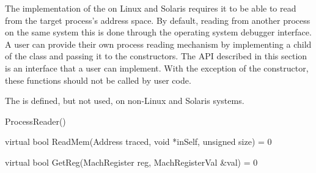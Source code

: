 The implementation of the  on Linux and Solaris requires it to be able to read from the target process's address space. By default, reading from another process on the same system this is done through the operating system debugger interface. A user can provide their own process reading mechanism by implementing a child of the  class and passing it to the  constructors. 
The API described in this section is an interface that a user can implement. With the exception of the  constructor, these functions should not be called by user code.

The  is defined, but not used, on non-Linux and Solaris systems.

\begin{apient}
ProcessReader()
\end{apient}

\begin{apient}
virtual bool ReadMem(Address traced,
                     void *inSelf,
                     unsigned size) = 0
\end{apient}

\begin{apient}
virtual bool GetReg(MachRegister reg,
                    MachRegisterVal &val) = 0
\end{apient}

